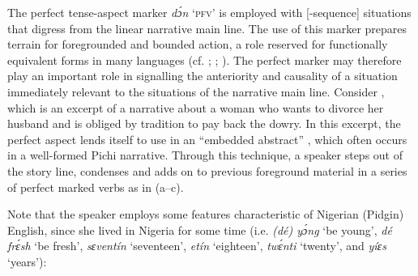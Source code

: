 \z
\z

The perfect tense-aspect marker \textit{dɔ́n} ‘\textsc{pfv}’ is employed with [-sequence] situations that digress from the linear narrative main line. The use of this marker prepares terrain for foregrounded and bounded action, a role reserved for functionally equivalent forms in many languages (cf. \citealt{Anderson1982}; \citealt{Li1982}; \citealt{Slobin1994}). The perfect marker may therefore play an important role in signalling the anteriority and causality of a situation immediately relevant to the situations of the narrative main line. Consider , which is an excerpt of a narrative about a woman who wants to divorce her husband and is obliged by tradition to pay back the dowry. In this excerpt, the perfect aspect lends itself to use in an “embedded abstract” \citep{Labov1972}, which often occurs in a well-formed Pichi narrative. Through this technique, a speaker steps out of the story line, condenses and adds on to previous foreground material in a series of perfect marked verbs as in (a–c).


Note that the speaker employs some features characteristic of Nigerian (Pidgin) English, since she lived in Nigeria for some time (i.e. \textit{(dé) yɔ́ng} ‘be young’, \textit{dé frɛ́sh} ‘be fresh’, \textit{sɛventín} ‘seventeen’, \textit{etín} ‘eighteen’, \textit{twɛ́nti} ‘twenty’, and \textit{yíɛs} ‘years’):



